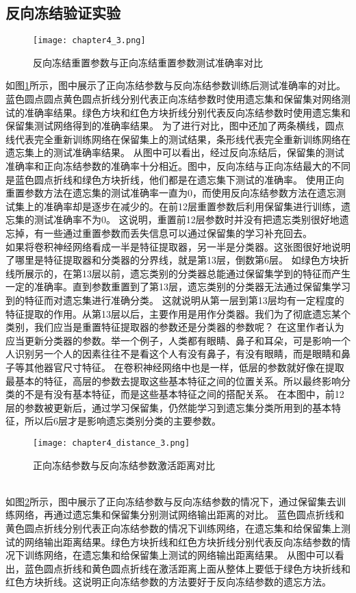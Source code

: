 \subsection{反向冻结验证实验}
\begin{figure}
    \centering
    \texttt{[image: chapter4\_3.png]}
    \caption{反向冻结重置参数与正向冻结重置参数测试准确率对比}
    \label{fig:chapter4_3}
\end{figure}
如图\ref{fig:chapter4_3}所示，图中展示了正向冻结参数与反向冻结参数训练后测试准确率的对比。
蓝色圆点圆点黄色圆点折线分别代表正向冻结参数时使用遗忘集和保留集对网络测试的准确率结果。绿色方块和红色方块折线分别代表反向冻结参数时使用遗忘集和保留集测试网络得到的准确率结果。
为了进行对比，图中还加了两条横线，圆点线代表完全重新训练网络在保留集上的测试结果，条形线代表完全重新训练网络在遗忘集上的测试准确率结果。
从图中可以看出，经过反向冻结后，保留集的测试准确率和正向冻结参数的准确率十分相近。图中，反向冻结与正向冻结最大的不同是蓝色圆点折线和绿色方块折线，他们都是在遗忘集下测试的准确率。
使用正向重置参数方法在遗忘集的测试准确率一直为0，而使用反向冻结参数方法在遗忘测试集上的准确率却是逐步在减少的。在前12层重置参数后利用保留集进行训练，遗忘集的测试准确率不为0。
这说明，重置前12层参数时并没有把遗忘类别很好地遗忘掉，有一些通过重置参数而丢失信息可以通过保留集的学习补充回去。
\\如果将卷积神经网络看成一半是特征提取器，另一半是分类器。这张图很好地说明了哪里是特征提取器和分类器的分界线，就是第13层，倒数第6层。
如绿色方块折线所展示的，在第13层以前，遗忘类别的分类器总能通过保留集学到的特征而产生一定的准确率。直到参数重置到了第13层，遗忘类别的分类器无法通过保留集学习到的特征而对遗忘集进行准确分类。
这就说明从第一层到第13层均有一定程度的特征提取的作用。从第13层以后，主要作用是用作分类器。我们为了彻底遗忘某个类别，我们应当是重置特征提取器的参数还是分类器的参数呢？
在这里作者认为应当更新分类器的参数。举一个例子，人类都有眼睛、鼻子和耳朵，可是影响一个人识别另一个人的因素往往不是看这个人有没有鼻子，有没有眼睛，而是眼睛和鼻子等其他器官尺寸特征。
在卷积神经网络中也是一样，低层的参数就好像在提取最基本的特征，高层的参数去提取这些基本特征之间的位置关系。所以最终影响分类的不是有没有基本特征，而是这些基本特征之间的搭配关系。
在本图中，前12层的参数被更新后，通过学习保留集，仍然能学习到遗忘集分类所用到的基本特征，所以后6层才是影响遗忘类别分类的主要参数。
\begin{figure}
    \centering
    \texttt{[image: chapter4\_distance\_3.png]}
    \caption{正向冻结参数与反向冻结参数激活距离对比}
    \label{fig:chapter4_distance_3}
\end{figure}
\\如图\ref{fig:chapter4_distance_3}所示，图中展示了正向冻结参数与反向冻结参数的情况下，通过保留集去训练网络，再通过遗忘集和保留集分别测试网络输出距离的对比。
蓝色圆点折线和黄色圆点折线分别代表正向冻结参数的情况下训练网络，在遗忘集和给保留集上测试的网络输出距离结果。绿色方块折线和红色方块折线分别代表反向冻结参数的情况下训练网络，在遗忘集和给保留集上测试的网络输出距离结果。
从图中可以看出，蓝色圆点折线和黄色圆点折线在激活距离上面从整体上要低于绿色方块折线和红色方块折线。这说明正向冻结参数的方法要好于反向冻结参数的遗忘方法。
